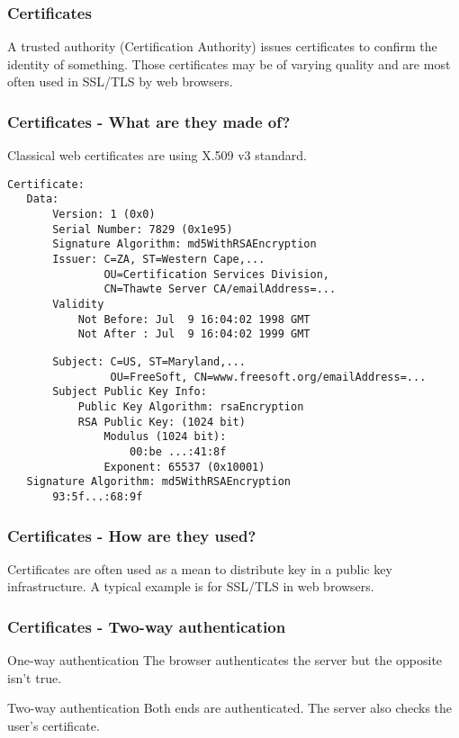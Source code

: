 \begin{frame}
\frametitle{Certificates}
A trusted authority (Certification Authority) issues certificates to
confirm the identity of something. Those certificates may be of varying
quality and are most often used in SSL/TLS by web browsers.
\end{frame}

\begin{frame}[fragile]
\frametitle{Certificates - What are they made of?}
Classical web certificates are using X.509 v3 standard.
\begin{lstlisting}
Certificate:
   Data:
       Version: 1 (0x0)
       Serial Number: 7829 (0x1e95)
       Signature Algorithm: md5WithRSAEncryption
       Issuer: C=ZA, ST=Western Cape,...
               OU=Certification Services Division,
               CN=Thawte Server CA/emailAddress=...
       Validity
           Not Before: Jul  9 16:04:02 1998 GMT
           Not After : Jul  9 16:04:02 1999 GMT
\end{lstlisting}
\end{frame}
\begin{frame}[fragile]
\begin{lstlisting}
       Subject: C=US, ST=Maryland,...
                OU=FreeSoft, CN=www.freesoft.org/emailAddress=...
       Subject Public Key Info:
           Public Key Algorithm: rsaEncryption
           RSA Public Key: (1024 bit)
               Modulus (1024 bit):
                   00:be ...:41:8f
               Exponent: 65537 (0x10001)
   Signature Algorithm: md5WithRSAEncryption
       93:5f...:68:9f
\end{lstlisting}
\end{frame}

\begin{frame}[allowframebreaks]
\frametitle{Certificates - How are they used?}
Certificates are often used as a mean to distribute key in a public
key infrastructure. A typical example is for SSL/TLS in web browsers.
\end{frame}

\begin{frame}
\frametitle{Certificates - Two-way authentication}
\begin{block}{One-way authentication}
The browser authenticates the server but the opposite isn't true.
\end{block}
\begin{block}{Two-way authentication}
Both ends are authenticated.
The server also checks the user's certificate.
\end{block}
\end{frame}

